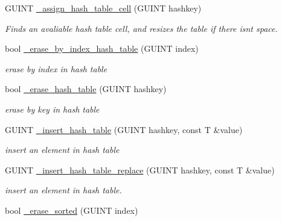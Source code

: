 \begin{DoxyCompactItemize}
G\+U\+I\+NT \hyperlink{classgim__hash__table_a93e5bf5c573a39e21e9bd0a4aec38e1a}{\+\_\+assign\+\_\+hash\+\_\+table\+\_\+cell} (G\+U\+I\+NT hashkey)
\begin{DoxyCompactList}\small\item\em Finds an avaliable hash table cell, and resizes the table if there isn\textquotesingle{}t space. \end{DoxyCompactList}\item 
\mbox{\label{classgim__hash__table_afbaacd523281706f94476ae60917856e}} 
bool \hyperlink{classgim__hash__table_afbaacd523281706f94476ae60917856e}{\+\_\+erase\+\_\+by\+\_\+index\+\_\+hash\+\_\+table} (G\+U\+I\+NT index)
\begin{DoxyCompactList}\small\item\em erase by index in hash table \end{DoxyCompactList}\item 
\mbox{\label{classgim__hash__table_af03ef67dcf7b0e805e34df6a5de4425f}} 
bool \hyperlink{classgim__hash__table_af03ef67dcf7b0e805e34df6a5de4425f}{\+\_\+erase\+\_\+hash\+\_\+table} (G\+U\+I\+NT hashkey)
\begin{DoxyCompactList}\small\item\em erase by key in hash table \end{DoxyCompactList}\item 
G\+U\+I\+NT \hyperlink{classgim__hash__table_a4339a279d721d1e687b8d8063332bac8}{\+\_\+insert\+\_\+hash\+\_\+table} (G\+U\+I\+NT hashkey, const T \&value)
\begin{DoxyCompactList}\small\item\em insert an element in hash table \end{DoxyCompactList}\item 
G\+U\+I\+NT \hyperlink{classgim__hash__table_a6ebfb7415bd946855ec5730651f7c191}{\+\_\+insert\+\_\+hash\+\_\+table\+\_\+replace} (G\+U\+I\+NT hashkey, const T \&value)
\begin{DoxyCompactList}\small\item\em insert an element in hash table. \end{DoxyCompactList}\item 
\mbox{\label{classgim__hash__table_ae347a062b1b5907b81127e6bacbbb10e}} 
bool \hyperlink{classgim__hash__table_ae347a062b1b5907b81127e6bacbbb10e}{\+\_\+erase\+\_\+sorted} (G\+U\+I\+NT index)

\end{DoxyCompactItemize}
